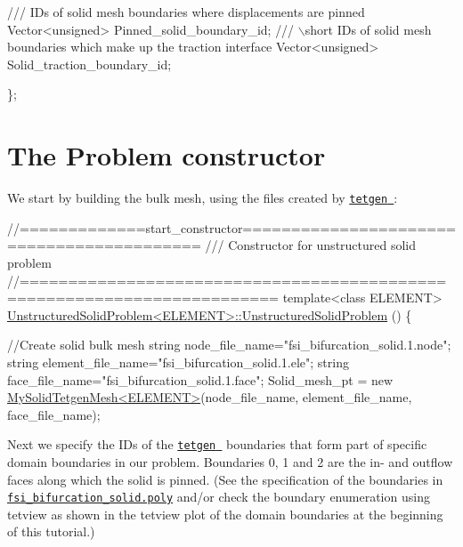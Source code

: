 \begin{DoxyCodeInclude}
\textcolor{comment}{}
\textcolor{comment}{ /// IDs of solid mesh boundaries where displacements are pinned}
\textcolor{comment}{} Vector<unsigned> Pinned\_solid\_boundary\_id;
\textcolor{comment}{}
\textcolor{comment}{ /// \(\backslash\)short IDs of solid mesh boundaries which make up the traction interface}
\textcolor{comment}{} Vector<unsigned> Solid\_traction\_boundary\_id;

\};

\end{DoxyCodeInclude}




 

\hypertarget{index_constructor}{}\section{The Problem constructor}\label{index_constructor}
We start by building the bulk mesh, using the files created by \href{http://wias-berlin.de/software/tetgen//}{\tt {\ttfamily tetgen} }\+:


\begin{DoxyCodeInclude}
\textcolor{comment}{//=============start\_constructor==========================================}
\textcolor{comment}{/// Constructor for unstructured solid problem}
\textcolor{comment}{}\textcolor{comment}{//========================================================================}
\textcolor{keyword}{template}<\textcolor{keyword}{class} ELEMENT>
\hyperlink{classUnstructuredSolidProblem_a18ce02b6e4bbc86403c9e1b32c095772}{UnstructuredSolidProblem<ELEMENT>::UnstructuredSolidProblem}
      ()
\{ 

  \textcolor{comment}{//Create solid bulk mesh}
 \textcolor{keywordtype}{string} node\_file\_name=\textcolor{stringliteral}{"fsi\_bifurcation\_solid.1.node"};
 \textcolor{keywordtype}{string} element\_file\_name=\textcolor{stringliteral}{"fsi\_bifurcation\_solid.1.ele"};
 \textcolor{keywordtype}{string} face\_file\_name=\textcolor{stringliteral}{"fsi\_bifurcation\_solid.1.face"};
 Solid\_mesh\_pt =  \textcolor{keyword}{new} \hyperlink{classMySolidTetgenMesh}{MySolidTetgenMesh<ELEMENT>}(node\_file\_name,
                                              element\_file\_name,
                                              face\_file\_name);

\end{DoxyCodeInclude}


Next we specify the I\+Ds of the \href{http://wias-berlin.de/software/tetgen//}{\tt {\ttfamily tetgen} } boundaries that form part of specific domain boundaries in our problem. Boundaries 0, 1 and 2 are the in-\/ and outflow faces along which the solid is pinned. (See the specification of the boundaries in \href{../../../../demo_drivers/solid/unstructured_three_d_solid/fsi_bifurcation_solid.poly}{\tt fsi\+\_\+bifurcation\+\_\+solid.\+poly} and/or check the boundary enumeration using {\ttfamily tetview} as shown in the {\ttfamily tetview} plot of the domain boundaries at the beginning of this tutorial.)


